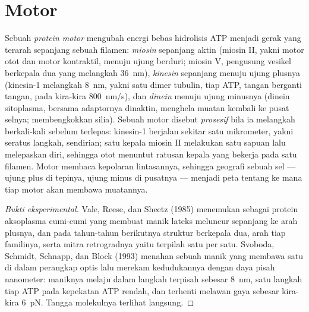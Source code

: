 \section{Motor}

\begin{definition}\label{def:b3:cytoskeleton-motility:motors}
Sebuah \emph{protein motor} mengubah energi bebas hidrolisis ATP menjadi gerak
yang terarah sepanjang sebuah filamen: \emph{miosin} sepanjang aktin (miosin
II, yakni motor otot dan motor kontraktil, menuju ujung berduri; miosin V,
pengusung vesikel berkepala dua yang melangkah \qty{36}{nm}), \emph{kinesin}
sepanjang  menuju ujung plusnya (kinesin-1 melangkah \qty{8}{nm},
yakni satu dimer tubulin, tiap ATP, tangan berganti tangan, pada kira-kira
\qty{800}{nm/s}), dan \emph{dinein} menuju ujung minusnya (dinein sitoplasma,
bersama adaptornya dinaktin, menghela muatan kembali ke pusat selnya;  membengkokkan silia). Sebuah motor disebut \emph{prosesif} bila ia
melangkah berkali-kali sebelum terlepas: kinesin-1 berjalan sekitar satu
mikrometer, yakni seratus langkah, sendirian; satu kepala miosin II melakukan
satu sapuan lalu melepaskan diri, sehingga otot menuntut ratusan kepala yang
bekerja pada satu filamen. Motor membaca kepolaran lintasannya, sehingga
geografi sebuah sel --- ujung plus di tepinya, ujung minus di pusatnya ---
menjadi peta tentang ke mana tiap motor akan membawa muatannya.
\end{definition}

\begin{proof}[Bukti eksperimental]
Vale, Reese, dan Sheetz (1985) menemukan  sebagai protein aksoplasma
cumi-cumi yang membuat manik lateks meluncur sepanjang  ke arah
plusnya, dan pada tahun-tahun berikutnya struktur berkepala dua, arah tiap
familinya, serta mitra retrogradnya yaitu  terpilah
satu per satu. Svoboda, Schmidt, Schnapp, dan Block (1993) menahan sebuah manik
yang membawa satu  di dalam perangkap optis lalu merekam kedudukannya
dengan daya pisah nanometer: maniknya melaju dalam langkah terpisah sebesar
\qty{8}{nm}, satu langkah tiap ATP pada kepekatan ATP rendah, dan terhenti
melawan gaya sebesar kira-kira \qty{6}{pN}. Tangga molekulnya terlihat
langsung.
\end{proof}

